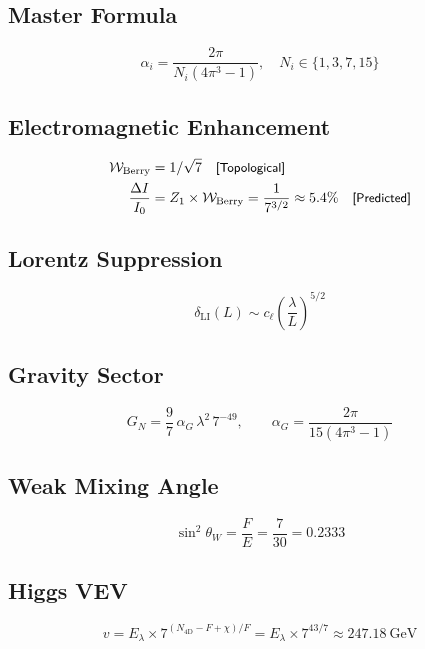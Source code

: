 \documentclass[12pt,a4paper]{article}
\theoremstyle{plain}
\theoremstyle{definition}
\newcommand{\Wberry}{\mathcal{W}_{\mathrm{Berry}}}
\newcommand{\elabel}[1]{\textsf{\small [#1]}}
\begin{document}
\subsection{Master Formula}
\begin{equation}
\alpha_i = \frac{2\pi}{N_i(4\pi^3 - 1)}, \quad N_i \in \{1, 3, 7, 15\}
\end{equation}

\subsection{Electromagnetic Enhancement}
\begin{align}
\Wberry &= 1/\sqrt{7} \quad\text{\elabel{Topological}} \\
\frac{\Delta I}{I_0} &= Z_1 \times \Wberry = \frac{1}{7^{3/2}} \approx 5.4\% \quad\text{\elabel{Predicted}}
\end{align}

\subsection{Lorentz Suppression}
\begin{equation}
\delta_{\mathrm{LI}}(L) \sim c_\ell \left(\frac{\lambda}{L}\right)^{5/2}
\end{equation}

\subsection{Gravity Sector}
\begin{equation}
G_N = \frac{9}{7}\,\alpha_G\,\lambda^2\,7^{-49}, \qquad \alpha_G = \frac{2\pi}{15(4\pi^3 - 1)}
\end{equation}

\subsection{Weak Mixing Angle}
\begin{equation}
\sin^2\theta_W = \frac{F}{E} = \frac{7}{30} = 0.2333
\end{equation}

\subsection{Higgs VEV}
\begin{equation}
v = E_\lambda \times 7^{(N_{4\mathrm{D}} - F + \chi)/F} = E_\lambda \times 7^{43/7} \approx 247.18~\text{GeV}
\end{equation}
\end{document}
